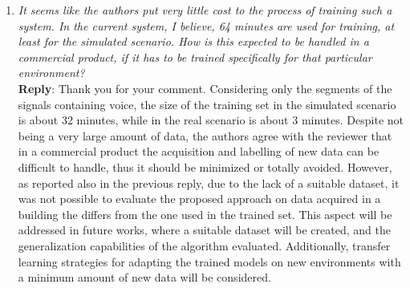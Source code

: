 \documentclass[11pt, technote, letterpaper, oneside, onecolumn]{IEEEtran}
\begin{document}
\begin{enumerate}
% 
% 	
% 	 

\item \textit{It seems like the authors put very little cost to the process of training such a system. In the current system, I believe, 64 minutes are used for training, at least for the simulated scenario. How is this expected to be handled in a commercial product, if it has to be trained specifically for that particular environment?\\}
\textbf{Reply}: Thank you for your comment. Considering only the segments of the signals containing voice, the size of the training set in the simulated scenario is about 32 minutes, while in the real scenario  is about 3 minutes. Despite not being a very large amount of data, the authors agree with the reviewer that in a commercial product the acquisition and labelling of new data can be difficult to handle, thus it should be minimized or totally avoided. However, as reported also in the previous reply, due to the lack of a suitable dataset, it was not possible to evaluate the proposed approach on data acquired in a building the differs from the one used in the trained set. This aspect will be addressed in future works, where a suitable dataset will be created, and the generalization capabilities of the algorithm evaluated. Additionally,  transfer learning strategies for adapting the trained models on new environments with a minimum amount of new data will be considered.


\end{enumerate}
\end{document}

